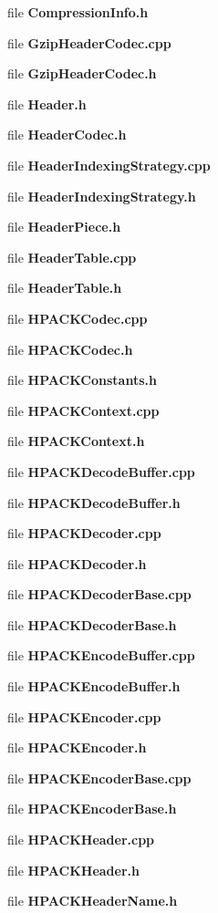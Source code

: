 \begin{DoxyCompactItemize}
\item 
file {\bf Compression\+Info.\+h}
\item 
file {\bf Gzip\+Header\+Codec.\+cpp}
\item 
file {\bf Gzip\+Header\+Codec.\+h}
\item 
file {\bf Header.\+h}
\item 
file {\bf Header\+Codec.\+h}
\item 
file {\bf Header\+Indexing\+Strategy.\+cpp}
\item 
file {\bf Header\+Indexing\+Strategy.\+h}
\item 
file {\bf Header\+Piece.\+h}
\item 
file {\bf Header\+Table.\+cpp}
\item 
file {\bf Header\+Table.\+h}
\item 
file {\bf H\+P\+A\+C\+K\+Codec.\+cpp}
\item 
file {\bf H\+P\+A\+C\+K\+Codec.\+h}
\item 
file {\bf H\+P\+A\+C\+K\+Constants.\+h}
\item 
file {\bf H\+P\+A\+C\+K\+Context.\+cpp}
\item 
file {\bf H\+P\+A\+C\+K\+Context.\+h}
\item 
file {\bf H\+P\+A\+C\+K\+Decode\+Buffer.\+cpp}
\item 
file {\bf H\+P\+A\+C\+K\+Decode\+Buffer.\+h}
\item 
file {\bf H\+P\+A\+C\+K\+Decoder.\+cpp}
\item 
file {\bf H\+P\+A\+C\+K\+Decoder.\+h}
\item 
file {\bf H\+P\+A\+C\+K\+Decoder\+Base.\+cpp}
\item 
file {\bf H\+P\+A\+C\+K\+Decoder\+Base.\+h}
\item 
file {\bf H\+P\+A\+C\+K\+Encode\+Buffer.\+cpp}
\item 
file {\bf H\+P\+A\+C\+K\+Encode\+Buffer.\+h}
\item 
file {\bf H\+P\+A\+C\+K\+Encoder.\+cpp}
\item 
file {\bf H\+P\+A\+C\+K\+Encoder.\+h}
\item 
file {\bf H\+P\+A\+C\+K\+Encoder\+Base.\+cpp}
\item 
file {\bf H\+P\+A\+C\+K\+Encoder\+Base.\+h}
\item 
file {\bf H\+P\+A\+C\+K\+Header.\+cpp}
\item 
file {\bf H\+P\+A\+C\+K\+Header.\+h}
\item 
file {\bf H\+P\+A\+C\+K\+Header\+Name.\+h}

\end{DoxyCompactItemize}
